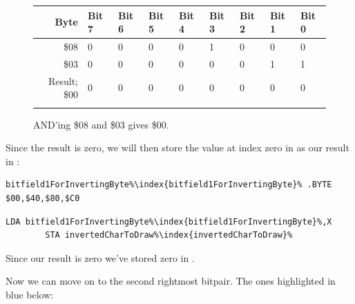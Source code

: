 \begin{figure}[H]
  {
    \setlength{\tabcolsep}{3.0pt}
    \setlength\cmidrulewidth{\heavyrulewidth} %
    \begin{adjustbox}{width=10cm,center}

      \begin{tabular}{rllllllll}
        \toprule
        Byte & Bit 7 & Bit 6 & Bit 5 & Bit 4 & Bit 3 & Bit 2 & Bit 1 & Bit 0        \\
        \midrule
        \$08 & 0 & 0 & 0 & 0 & 1 & 0 & 0 & 0 \\
        \$03 & 0 & 0 & 0 & 0 & 0 & 0 & 1 & 1 \\
        \midrule
        Result; \$00 & 0 & 0 & 0 & 0 & 0 & 0 & 0 & 0 \\
        \addlinespace
        \bottomrule
      \end{tabular}

    \end{adjustbox}

  }\caption*{AND'ing \$08 and \$03 gives \$00.}
\end{figure}
\vspace{-0.5cm}

Since the result is zero, we will then store the value at index zero in 
as our result in :

\begin{lstlisting}[escapechar=\%]
bitfield1ForInvertingByte%\index{bitfield1ForInvertingByte}% .BYTE $00,$40,$80,$C0
\end{lstlisting}
\begin{lstlisting}[escapechar=\%]
        LDA bitfield1ForInvertingByte%\index{bitfield1ForInvertingByte}%,X
        STA invertedCharToDraw%\index{invertedCharToDraw}%
\end{lstlisting}

Since our result is zero we've stored zero in .

Now we can move on to the second rightmost bitpair. The ones highlighted in blue below:

